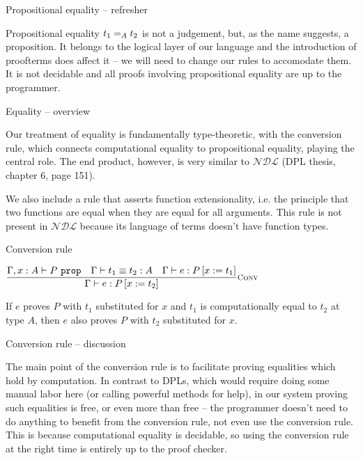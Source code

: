 \documentclass{beamer}
\newcommand{\NDL}{\mathcal{NDL}}
\begin{document}
\begin{frame}{Propositional equality -- refresher}

Propositional equality $\Eq[A]{t_1}{t_2}$ is not a judgement, but, as the name suggests, a proposition. It belongs to the logical layer of our language and the introduction of proofterms does affect it -- we will need to change our rules to accomodate them. It is not decidable and all proofs involving propositional equality are up to the programmer.

\end{frame}

\begin{frame}{Equality -- overview}

Our treatment of equality is fundamentally type-theoretic, with the conversion rule, which connects computational equality to propositional equality, playing the central role. The end product, however, is very similar to $\NDL$ (DPL thesis, chapter 6, page 151).

\vspace{2em}

We also include a rule that asserts function extensionality, i.e. the principle that two functions are equal when they are equal for all arguments. This rule is not present in $\NDL$ because its language of terms doesn't have function types.

\end{frame}

\begin{frame}{Conversion rule}

\begin{center}
  $\infrule[Conv]{\prop[\extend{\Gamma}{x}{A}]{P} \quad \compeq{t_1}{t_2}{A} \quad \proves{e}{\subst{P}{x}{t_1}}}{\proves{e}{\subst{P}{x}{t_2}}}$
\end{center}

\vspace{2em}

If $e$ proves $P$ with $t_1$ substituted for $x$ and $t_1$ is computationally equal to $t_2$ at type $A$, then $e$ also proves $P$ with $t_2$ substituted for $x$.

\end{frame}

\begin{frame}{Conversion rule -- discussion}

The main point of the conversion rule is to facilitate proving equalities which hold by computation. In contrast to DPLs, which would require doing some manual labor here (or calling powerful methods for help), in our system proving such equalities is free, or even more than free -- the programmer doesn't need to do anything to benefit from the conversion rule, not even use the conversion rule. This is because computational equality is decidable, so using the conversion rule at the right time is entirely up to the proof checker.

\end{frame}
\end{document}
